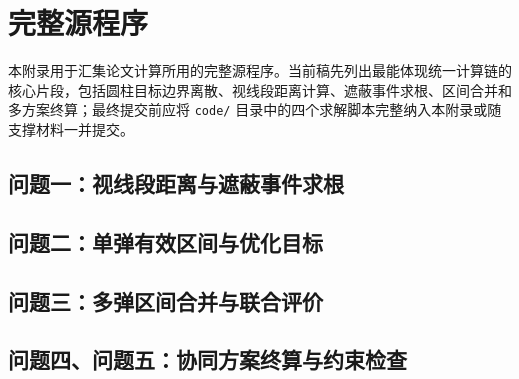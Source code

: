 \section{完整源程序}

本附录用于汇集论文计算所用的完整源程序。当前稿先列出最能体现统一计算链的核心片段，包括圆柱目标边界离散、视线段距离计算、遮蔽事件求根、区间合并和多方案终算；最终提交前应将 \texttt{code/} 目录中的四个求解脚本完整纳入本附录或随支撑材料一并提交。

\subsection{问题一：视线段距离与遮蔽事件求根}


\subsection{问题二：单弹有效区间与优化目标}


\subsection{问题三：多弹区间合并与联合评价}


\subsection{问题四、问题五：协同方案终算与约束检查}

